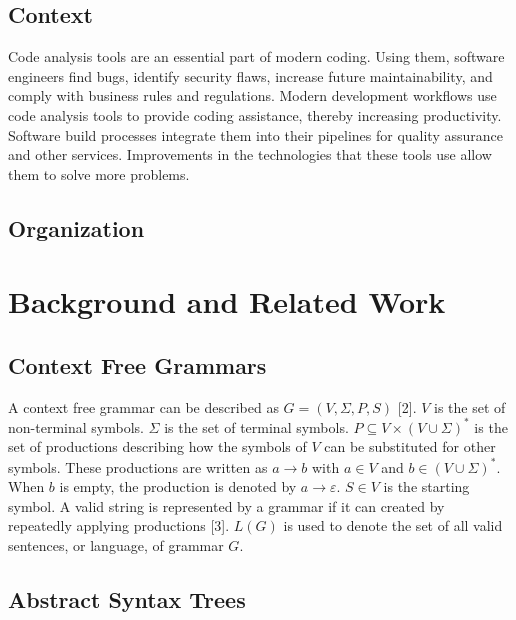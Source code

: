 \documentclass[conference,compsoc]{IEEEtran}
\begin{document}
\hypertarget{context}{%
\subsection{Context}\label{context}}

Code analysis tools are an essential part of modern coding. Using them,
software engineers find bugs, identify security flaws, increase future
maintainability, and comply with business rules and regulations. Modern
development workflows use code analysis tools to provide coding
assistance, thereby increasing productivity. Software build processes
integrate them into their pipelines for quality assurance and other
services. Improvements in the technologies that these tools use allow
them to solve more problems.

\hypertarget{organization}{%
\subsection{Organization}\label{organization}}

\hypertarget{background-and-related-work}{%
\section{Background and Related
Work}\label{background-and-related-work}}

\hypertarget{context-free-grammars}{%
\subsection{Context Free Grammars}\label{context-free-grammars}}

A context free grammar can be described as \(G = (V,\Sigma{},P,S)\)
{[}2{]}. \(V\) is the set of non-terminal symbols. \(\Sigma\) is the set
of terminal symbols. \(P \subseteq V \times (V\cup\Sigma)^*\) is the set
of productions describing how the symbols of \(V\) can be substituted
for other symbols. These productions are written as \(a \rightarrow b\)
with \(a \in V\) and \(b \in (V\cup\Sigma)^*\). When \(b\) is empty, the
production is denoted by \(a \rightarrow \varepsilon\). \(S \in V\) is
the starting symbol. A valid string is represented by a grammar if it
can created by repeatedly applying productions {[}3{]}. \(L(G)\) is used
to denote the set of all valid sentences, or language, of grammar \(G\).

\hypertarget{abstract-syntax-trees}{%
\subsection{Abstract Syntax Trees}\label{abstract-syntax-trees}}
\end{document}
